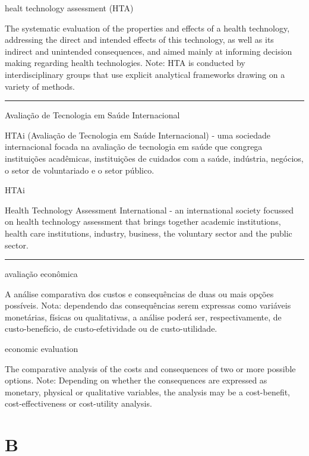 \documentclass[
  openany]{book}
\begin{document}
healt technology assessment (HTA)

The systematic evaluation of the properties and effects of a health technology, addressing the direct and intended effects of this technology, as well as its indirect and unintended consequences, and aimed mainly at informing decision making regarding health technologies. Note: HTA is conducted by interdisciplinary groups that use explicit analytical frameworks drawing on a variety of methods.

\begin{center}\rule{0.5\linewidth}{0.5pt}\end{center}

Avaliação de Tecnologia em Saúde Internacional

HTAi (Avaliação de Tecnologia em Saúde Internacional) - uma sociedade internacional focada na avaliação de tecnologia em saúde que congrega instituições acadêmicas, instituições de cuidados com a saúde, indústria, negócios, o setor de voluntariado e o setor público.

HTAi

Health Technology Assessment International - an international society focussed on health technology assessment that brings together academic institutions, health care institutions, industry, business, the voluntary sector and the public sector.

\begin{center}\rule{0.5\linewidth}{0.5pt}\end{center}

avaliação econômica

A análise comparativa dos custos e consequências de duas ou mais opções possíveis. Nota: dependendo das consequências serem expressas como variáveis monetárias, físicas ou qualitativas, a análise poderá ser, respectivamente, de custo-benefício, de custo-efetividade ou de custo-utilidade.

economic evaluation

The comparative analysis of the costs and consequences of two or more possible options. Note: Depending on whether the consequences are expressed as monetary, physical or qualitative variables, the analysis may be a cost-benefit, cost-effectiveness or cost-utility analysis.

\hypertarget{b}{%
\chapter*{B}\label{b}}
\end{document}
